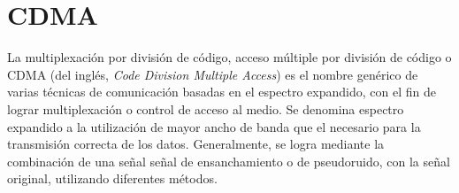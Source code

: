 




\section{CDMA}
\label{espectroensanchado}
La multiplexación por división de código, acceso múltiple por división de código o CDMA (del inglés, \textit{Code Division Multiple Access}) es el nombre genérico de varias técnicas de comunicación basadas en el espectro expandido, con el fin de lograr multiplexación o control de acceso al medio. 
Se denomina espectro expandido a la utilización de mayor ancho de banda que el necesario para la transmisión correcta de los datos. Generalmente, se logra mediante la combinación de una señal señal de ensanchamiento o de pseudoruido, con la señal original, utilizando diferentes métodos.

